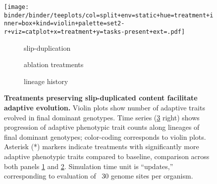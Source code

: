 \begin{figure}[!h]
  \centering
  \begin{adjustbox}{scale=0.8}
    \texttt{[image: binder/binder/teeplots/col=split+env=static+hue=treatment+inner=box+kind=violin+palette=set2-r+viz=catplot+x=treatment+y=tasks-present+ext=.pdf]}%
    \hspace*{-2.0cm}%
    \raisebox{0.125in}{%
      \texttt{[image: binder/binder/teeplots/env=static+errorbar=ci+exp=below+hue=treatment+kind=line+palette=set2-r+viz=relplot+x=time-100k+y=tasks-present+ext=.pdf]}}%
  \end{adjustbox}

  \vspace{-7ex}

  \begin{subfigure}{0.3\textwidth}
    \caption{\small slip-duplication}
    \label{fig:results_panels:slip_duplication}
  \end{subfigure}%
  \begin{subfigure}{0.35\textwidth}
    \caption{\small ablation treatments}
    \label{fig:results_panels:ablation}
  \end{subfigure}%
  \begin{subfigure}{0.22\textwidth}
    \caption{\small lineage history}
    \label{fig:results_panels:time_series}
  \end{subfigure}

  \vspace{1ex}

  \caption{\textbf{Treatments preserving slip-duplicated content facilitate adaptive evolution.}
    \small Violin plots show number of adaptive traits evolved in final dominant genotypes.
    Time series (\ref{fig:results_panels:time_series} right) shows progression of adaptive phenotypic trait counts along lineages of final dominant genotypes; color-coding corresponds to violin plots.
    Asterisk (*) markers indicate treatments with significantly more adaptive phenotypic traits compared to baseline, comparison across both panels \ref{fig:results_panels:slip_duplication} and \ref{fig:results_panels:ablation}.
    Simulation time unit is “updates,” corresponding to evaluation of ~30 genome sites per organism.}
  \label{fig:results_panels}
\end{figure}
